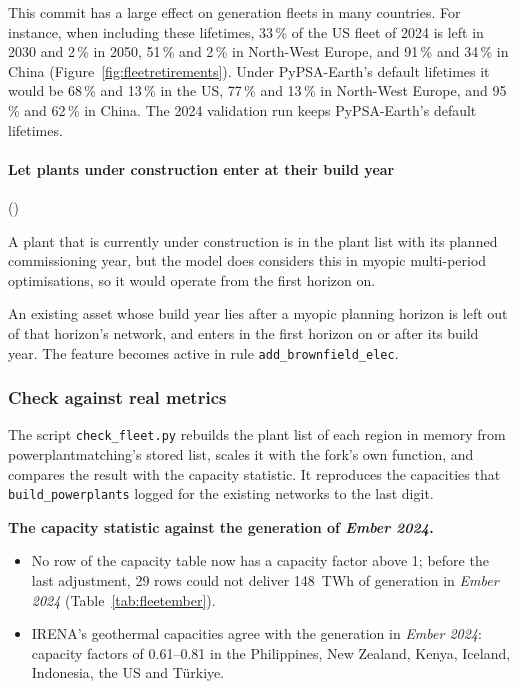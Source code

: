 This commit has a large effect on generation fleets in many countries. 
For instance, when including these lifetimes, 33\,\% of the US fleet of 2024 is left in 2030 and 2\,\% in 2050, 51\,\% and 2\,\% in North-West Europe, and 91\,\% and 34\,\% in China (Figure~\ref{fig:fleetretirements}).
Under PyPSA-Earth's default lifetimes it would be 68\,\% and 13\,\% in the US, 77\,\% and 13\,\% in North-West Europe, and 95\,\% and 62\,\% in China.
The 2024 validation run keeps PyPSA-Earth's default lifetimes.

\paragraph{Let plants under construction enter at their build year} ()

A plant that is currently under construction is in the plant list with its planned commissioning year, but the model does considers this in myopic multi-period optimisations, so it would operate from the first horizon on.

An existing asset whose build year lies after a myopic planning horizon is left out of that horizon's network, and enters in the first horizon on or after its build year.
The feature becomes active in rule \texttt{add\_brownfield\_elec}.

\FloatBarrier
\subsubsection{Check against real metrics}\label{sec:fleet-check}

The script \texttt{check\_fleet.py} rebuilds the plant list of each region in memory from powerplantmatching's stored list, scales it with the fork's own function, and compares the result with the capacity statistic.
It reproduces the capacities that \texttt{build\_powerplants} logged for the existing networks to the last digit.

\textbf{The capacity statistic against the generation of \textit{Ember 2024}.}
\begin{itemize}[nosep,leftmargin=*]
  \item No row of the capacity table now has a capacity factor above 1; before the last adjustment, 29 rows could not deliver \SI{148}{TWh} of generation in \textit{Ember 2024} (Table~\ref{tab:fleetember}).
  \item IRENA's geothermal capacities agree with the generation in \textit{Ember 2024}: capacity factors of 0.61--0.81 in the Philippines, New Zealand, Kenya, Iceland, Indonesia, the US and Türkiye.
\end{itemize}

